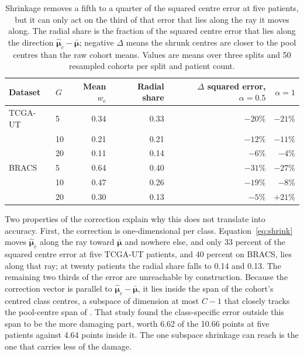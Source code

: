 \documentclass[11pt]{article}
\begin{document}
\begin{table}[htbp]
\centering
\small
\renewcommand{\arraystretch}{1.15}
\begin{tabular}{@{}llrrrr@{}}
\toprule
Dataset & $G$ & Mean $w_c$ & Radial share & $\Delta$ squared error, $\alpha=0.5$ & $\alpha=1$ \\
\midrule
TCGA-UT & 5 & 0.34 & 0.33 & $-20\%$ & $-21\%$ \\
        & 10 & 0.21 & 0.21 & $-12\%$ & $-11\%$ \\
        & 20 & 0.11 & 0.14 & $-6\%$ & $-4\%$ \\
\addlinespace
BRACS & 5 & 0.64 & 0.40 & $-31\%$ & $-27\%$ \\
      & 10 & 0.47 & 0.26 & $-19\%$ & $-8\%$ \\
      & 20 & 0.30 & 0.13 & $-5\%$ & $+21\%$ \\
\bottomrule
\end{tabular}
\caption{Shrinkage removes a fifth to a quarter of the squared centre error at five patients, but it can only act on the third of that error that lies along the ray it moves along. The radial share is the fraction of the squared centre error that lies along the direction $\hat{\boldsymbol\mu}_c-\bar{\boldsymbol\mu}$; negative $\Delta$ means the shrunk centres are closer to the pool centres than the raw cohort means. Values are means over three splits and 50 resampled cohorts per split and patient count.}
\label{tab:geometry}
\end{table}

\noindent Two properties of the correction explain why this does not translate into accuracy. First, the correction is one-dimensional per class. Equation~\ref{eq:shrink} moves $\hat{\boldsymbol\mu}_c$ along the ray toward $\bar{\boldsymbol\mu}$ and nowhere else, and only 33 percent of the squared centre error at five TCGA-UT patients, and 40 percent on BRACS, lies along that ray; at twenty patients the radial share falls to 0.14 and 0.13. The remaining two thirds of the error are unreachable by construction. Because the correction vector is parallel to $\hat{\boldsymbol\mu}_c-\bar{\boldsymbol\mu}$, it lies inside the span of the cohort's centred class centres, a subspace of dimension at most $C-1$ that closely tracks the pool-centre span of \citet{queisler2026centreError}. That study found the class-specific error outside this span to be the more damaging part, worth 6.62 of the 10.66 points at five patients against 4.64 points inside it. The one subspace shrinkage can reach is the one that carries less of the damage.
\end{document}
